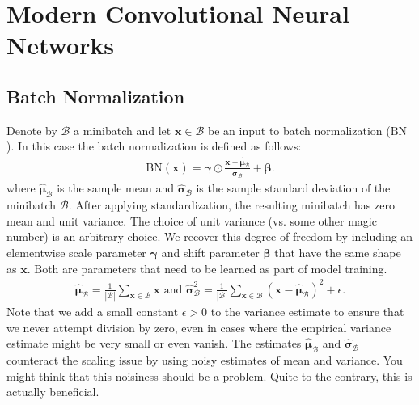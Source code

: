 \documentclass[a4paper,12pt]{article}
\theoremstyle{definition}
\begin{document}
\section{Modern Convolutional Neural Networks}
\subsection*{Batch Normalization}
Denote by $\mathcal{B}$ a minibatch and let $\mathbf{x} \in \mathcal{B}$ be an input to batch normalization ($\mathrm{BN}$). In this case the batch normalization is defined as follows:
\begin{equation*}
    \begin{aligned}
        \mathrm{BN}(\mathbf{x}) = \boldsymbol{\gamma} \odot \frac{\mathbf{x} - \hat{\boldsymbol{\mu}}_\mathcal{B}}{\hat{\boldsymbol{\sigma}}_\mathcal{B}} + \boldsymbol{\beta}.
    \end{aligned}
\end{equation*}
where $\hat{\boldsymbol{\mu}}_\mathcal{B}$ is the sample mean and $\hat{\boldsymbol{\sigma}}_\mathcal{B}$
is the sample standard deviation of the minibatch $\mathcal{B}$. After applying standardization, the resulting minibatch has zero mean and unit variance. The choice of unit variance
(vs. some other magic number) is an arbitrary choice. We recover this degree of freedom by including an elementwise scale parameter $\boldsymbol{\gamma}$ and shift parameter $\boldsymbol{\beta}$
that have the same shape as $\mathbf{x}$. Both are parameters that need to be learned as part of model training.
\begin{equation*}
    \begin{aligned}
        \hat{\boldsymbol{\mu}}_\mathcal{B} = \frac{1}{|\mathcal{B}|} \sum_{\mathbf{x} \in \mathcal{B}} \mathbf{x}
        \text{ and }
        \hat{\boldsymbol{\sigma}}_\mathcal{B}^2 = \frac{1}{|\mathcal{B}|} \sum_{\mathbf{x} \in \mathcal{B}} (\mathbf{x} - \hat{\boldsymbol{\mu}}_{\mathcal{B}})^2 + \epsilon.
    \end{aligned}
\end{equation*}
Note that we add a small constant $\epsilon > 0$ to the variance estimate to ensure that we never attempt division by zero, even in cases where the empirical variance estimate
might be very small or even vanish. The estimates $\hat{\boldsymbol{\mu}}_\mathcal{B}$ and ${\hat{\boldsymbol{\sigma}}_\mathcal{B}}$
counteract the scaling issue by using noisy estimates of mean and variance. You might think that this noisiness should be a problem. Quite to the contrary, this is actually beneficial.
\end{document}
